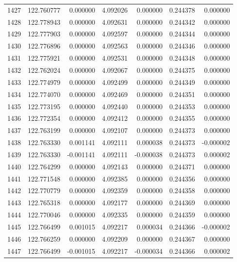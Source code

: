 \begin{tabular}{rrrrrrr}
1427 & 122.760777 &    0.000000 &  4.092026 &    0.000000 &    0.244378 &  0.000000 \\
1428 & 122.778943 &    0.000000 &  4.092631 &    0.000000 &    0.244342 &  0.000000 \\
1429 & 122.777903 &    0.000000 &  4.092597 &    0.000000 &    0.244344 &  0.000000 \\
1430 & 122.776896 &    0.000000 &  4.092563 &    0.000000 &    0.244346 &  0.000000 \\
1431 & 122.775921 &    0.000000 &  4.092531 &    0.000000 &    0.244348 &  0.000000 \\
1432 & 122.762024 &    0.000000 &  4.092067 &    0.000000 &    0.244375 &  0.000000 \\
1433 & 122.774979 &    0.000000 &  4.092499 &    0.000000 &    0.244349 &  0.000000 \\
1434 & 122.774070 &    0.000000 &  4.092469 &    0.000000 &    0.244351 &  0.000000 \\
1435 & 122.773195 &    0.000000 &  4.092440 &    0.000000 &    0.244353 &  0.000000 \\
1436 & 122.772354 &    0.000000 &  4.092412 &    0.000000 &    0.244355 &  0.000000 \\
1437 & 122.763199 &    0.000000 &  4.092107 &    0.000000 &    0.244373 &  0.000000 \\
1438 & 122.763330 &    0.001141 &  4.092111 &    0.000038 &    0.244373 & -0.000002 \\
1439 & 122.763330 &   -0.001141 &  4.092111 &   -0.000038 &    0.244373 &  0.000002 \\
1440 & 122.764299 &    0.000000 &  4.092143 &    0.000000 &    0.244371 &  0.000000 \\
1441 & 122.771548 &    0.000000 &  4.092385 &    0.000000 &    0.244356 &  0.000000 \\
1442 & 122.770779 &    0.000000 &  4.092359 &    0.000000 &    0.244358 &  0.000000 \\
1443 & 122.765318 &    0.000000 &  4.092177 &    0.000000 &    0.244369 &  0.000000 \\
1444 & 122.770046 &    0.000000 &  4.092335 &    0.000000 &    0.244359 &  0.000000 \\
1445 & 122.766499 &    0.001015 &  4.092217 &    0.000034 &    0.244366 & -0.000002 \\
1446 & 122.766259 &    0.000000 &  4.092209 &    0.000000 &    0.244367 &  0.000000 \\
1447 & 122.766499 &   -0.001015 &  4.092217 &   -0.000034 &    0.244366 &  0.000002 \\

\end{tabular}

